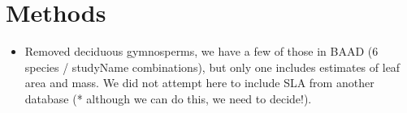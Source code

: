 \documentclass[a4paper]{article}
\begin{document}
\section{Methods}

\begin{itemize}
  \item Removed deciduous gymnosperms, we have a few of those in BAAD (6 species / studyName combinations), but only one includes estimates of leaf area and mass. We did not attempt here to include SLA from another database (* although we can do this, we need to decide!).
\end{itemize}
\end{document}
